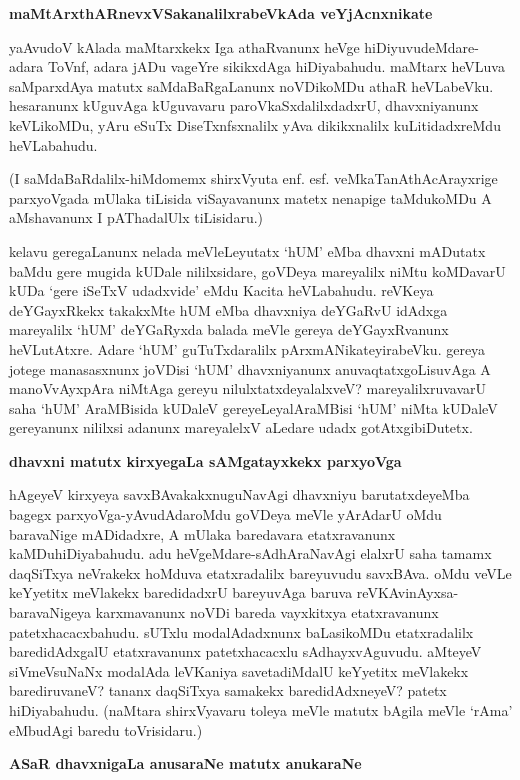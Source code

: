 {\bigskip
\noindent
{\large\bf maMtArxthARnevxVSakanalilxrabeVkAda veYjAcnxnikate}}\label{page119}
\medskip

\noindent
yaAvudoV kAlada maMtarxkekx Iga athaRvanunx heVge hiDiyuvudeMdare-adara ToVnf, adara jADu vageYre sikikxdAga hiDiyabahudu. maMtarx heVLuva saMparxdAya matutx saMdaBaRgaLanunx noVDikoMDu athaR heVLa\-beVku. hesaranunx kUguvAga kUguvavaru paroVkaSxdalilxdadxrU, dhavxniyanunx keVLikoMDu, yAru eSuTx DiseTxnfsx\-nalilx yAva dikikxnalilx kuLitidadxreMdu heVLabahudu.

(I saMdaBaRdalilx-hiMdomemx shirxVyuta enf. esf. veMkaTanAthAcArayxrige 
parxyoVgada mUlaka tiLisida viSayavanunx matetx nenapige taMdukoMDu A aMshavanunx I pAThadalUlx tiLisidaru.)

kelavu geregaLanunx nelada meVleLeyutatx `hUM' eMba dhavxni mADutatx 
baMdu gere mugida kUDale nililx\-sidare, goVDeya mareyalilx niMtu 
koMDavarU kUDa `gere iSeTxV udadxvide' eMdu Kacita heVLa\-bahudu. reVKeya 
deYGayxRkekx takakxMte hUM eMba dhavxniya deYGaRvU idAdxga mareyalilx `hUM' deYGaRyx\-da balada meVle gereya deYGayxRvanunx heVLutAtxre. Adare `hUM' guTuTxdaralilx pArxmANikateyirabeVku. gereya jotege manasasxnunx joVDisi `hUM' dhavxniyanunx anuvaqtatxgoLisuvAga A manoVvAyxpAra \-niMtAga gere\-yu nilulxtatxdeyalalxveV? mareyalilxruvavarU saha `hUM' AraMBisida kUDaleV gere\-yeLeya\-lAraMBisi `hUM' niMta kUDaleV gereyanunx nililxsi adanunx mareyalelxV aLedare udadx gotAtxgibiDutetx.

{\bigskip
\noindent
{\large\bf dhavxni matutx kirxyegaLa sAMgatayxkekx parxyoVga}}\label{page120}
\medskip

\noindent
hAgeyeV kirxyeya savxBAvakakxnuguNavAgi dhavxniyu barutatxdeyeMba 
bagegx parxyoVga\--yAvudAda\-roMdu goVDeya meVle yArAdarU oMdu baravaNige\break 
mADidadxre, A mUlaka baredavara etatxravanunx kaMDu\-hiDiya\-bahudu. adu heVgeMdare-sAdhAraNavAgi elalxrU saha tamamx daqSiTxya neVrakekx hoMduva etatxra\-dalilx bareyuvudu savxBAva. oMdu veVLe keYyetitx meVlakekx baredidadxrU bareyuvAga baruva reVKA\-vinAyxsa-baravaNigeya karxmavanunx noVDi bareda vayxkitxya etatxravanunx patetxhacacxbahudu. sUTxlu modalA\-dadxnunx baLasikoMDu etatxradalilx baredidAdxgalU etatxravanunx patetxhacacxlu sAdhayxvAguvudu. aMteyeV siVmeVsuNaNx modalAda leVKa\-niya savetadiMdalU keYyetitx meVlakekx bare\-diruvaneV? tananx daqSiTxya samakekx bare\-didAdxneyeV? patetx hiDiyabahudu. (naMtara shirxVyavaru toleya meVle matutx bAgila meVle `rAma' eMbudAgi baredu toVrisidaru.)
  
  {\bigskip
\noindent
{\large\bf ASaR dhavxnigaLa anusaraNe matutx anukaraNe}}
\medskip

